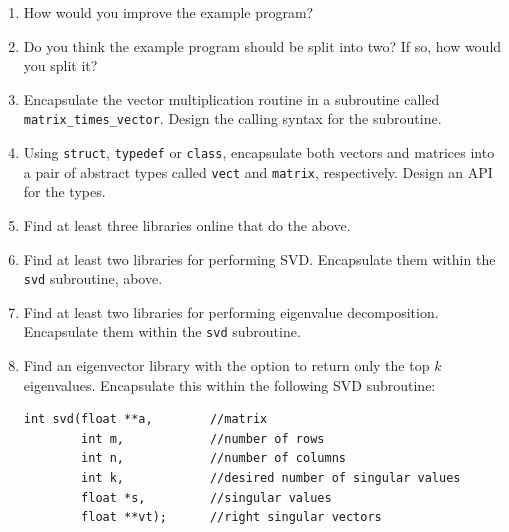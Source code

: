 \documentclass{article}
\begin{document}
\begin{enumerate}
  \item How would you improve the example program?
  \item Do you think the example program should be split into two? If so, how would you split it?
  \item Encapsulate the vector multiplication routine in a subroutine called \verb/matrix_times_vector/. Design the calling syntax for the subroutine.
  \item Using \verb/struct/, \verb/typedef/ or \verb/class/, encapsulate both vectors and matrices into a pair of abstract types called \verb/vect/ and \verb/matrix/, respectively. Design an API for the types.
  \item Find at least three libraries online that do the above.
  \item Find at least two libraries for performing SVD. 
Encapsulate them within the \verb/svd/ subroutine, above.
  \item Find at least two libraries for performing eigenvalue decomposition.
Encapsulate them within the \verb/svd/ subroutine.
  \item Find an eigenvector library with the option to return only the top $k$ eigenvalues.
Encapsulate this within the following SVD subroutine:
\begin{verbatim}
int svd(float **a,        //matrix
        int m,            //number of rows
        int n,            //number of columns
        int k,            //desired number of singular values
        float *s,         //singular values
        float **vt);      //right singular vectors
\end{verbatim}
\end{enumerate}
\end{document}
